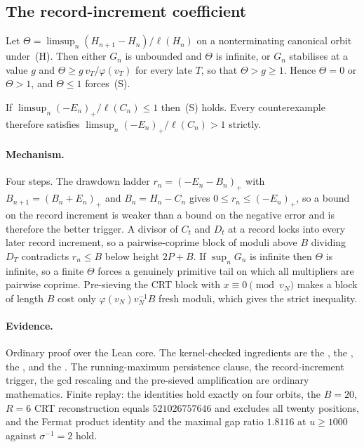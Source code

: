 \subsection{The record-increment coefficient}

\begin{theorem}\label{long243:res:recorddichotomy}
Let $\Theta=\limsup_n(H_{n+1}-H_n)/\ell(H_n)$ on a nonterminating canonical
orbit under~(H).  Then either $G_n$ is unbounded and $\Theta$ is infinite, or
$G_n$ stabilises at a value $g$ and $\Theta\ge g\,v_T/\varphi(v_T)$ for every
late $T$, so that $\Theta>g\ge1$.  Hence $\Theta=0$ or $\Theta>1$, and
$\Theta\le1$ forces~(S).
\end{theorem}

\begin{corollary}\label{long243:res:loglogboundary}
If $\limsup_n(-E_n)_+/\ell(C_n)\le1$ then~(S) holds.  Every counterexample
therefore satisfies $\limsup_n(-E_n)_+/\ell(C_n)>1$ strictly.
\end{corollary}

\paragraph{Mechanism.}
Four steps.  The drawdown ladder $r_n=(-E_n-B_n)_+$ with $B_{n+1}=(B_n+E_n)_+$
and $B_n=H_n-C_n$ gives $0\le r_n\le(-E_n)_+$, so a bound on the record
increment is weaker than a bound on the negative error and is therefore the
better trigger.  A divisor of $C_t$ and $D_t$ at a record locks into every later
record increment, so a pairwise-coprime block of moduli above $B$ dividing $D_T$
contradicts $r_n\le B$ below height $2P+B$.  If $\sup_nG_n$ is infinite then
$\Theta$ is infinite, so a finite $\Theta$ forces a genuinely primitive tail on
which all
multipliers are pairwise coprime.  Pre-sieving the CRT block with $x\equiv0
\pmod{v_N}$ makes a block of length $B$ cost only $\varphi(v_N)v_N^{-1}B$ fresh
moduli, which gives the strict inequality.

\paragraph{Evidence.}
Ordinary proof over the Lean core.  The kernel-checked ingredients are the
, the
, the
, and the
.  The running-maximum persistence clause, the record-increment
trigger, the gcd rescaling and the pre-sieved amplification are ordinary
mathematics.  Finite replay: the identities hold exactly on four orbits, the
$B=20$, $R=6$ CRT reconstruction equals $521026757646$ and excludes all twenty
positions, and the Fermat product identity and the maximal gap ratio $1.8116$ at
$u\ge1000$ against $\sigma^{-1}=2$ hold.

